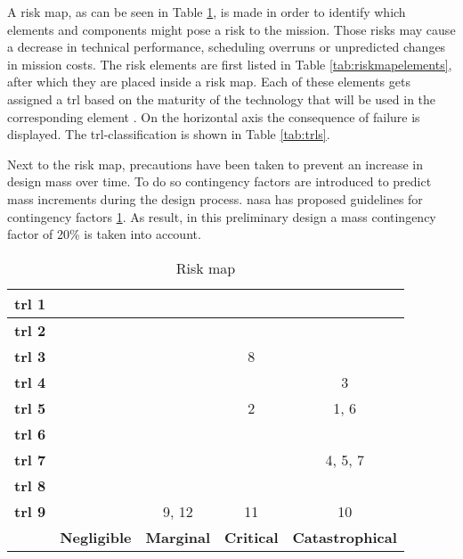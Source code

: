 A risk map, as can be seen in Table \ref{tab:riskmap}, is made in order to identify which elements and components might pose a risk to the mission. Those risks may cause a decrease in technical performance, scheduling overruns or unpredicted changes in mission costs. The risk elements are first listed in Table \ref{tab:riskmapelements}, after which they are placed inside a risk map. Each of these elements gets assigned a \gls{trl} based on the maturity of the technology that will be used in the corresponding element \cite{NASA2007}. On the horizontal axis the consequence of failure is displayed. The \gls{trl}-classification is shown in Table \ref{tab:trls}.

Next to the risk map, precautions have been taken to prevent an increase in design mass over time. To do so contingency factors are introduced to predict mass increments during the design process. \gls{nasa} has proposed guidelines for contingency factors \ref{tab:riskmap}. As result, in this preliminary design a mass contingency factor of 20\% is taken into account.

\begin{table}[h]
	\centering
	\caption{Risk map}
	\label{tab:riskmap}
	\begin{tabular}{|c|c|c|c|c|} %
		\hline
		\textbf{\gls{trl} 1} & \cellcolor{green!70} & \cellcolor{yellow!75}  & \cellcolor{red!60} & \cellcolor{red!60}  \\ \hline
		\textbf{\gls{trl} 2} & \cellcolor{green!70} & \cellcolor{yellow!75}  & \cellcolor{red!60} & \cellcolor{red!60} \\ \hline
		\textbf{\gls{trl} 3} & \cellcolor{green!70} & \cellcolor{yellow!75} & \cellcolor{yellow!75} 8 & \cellcolor{red!60}  \\ \hline
		\textbf{\gls{trl} 4} & \cellcolor{green!70} & \cellcolor{yellow!75} & \cellcolor{yellow!75} & \cellcolor{yellow!75} 3 \\ \hline
		\textbf{\gls{trl} 5} & \cellcolor{green!70} & \cellcolor{green!70} & \cellcolor{yellow!75} 2 & \cellcolor{yellow!75} 1, 6 \\ \hline
		\textbf{\gls{trl} 6} & \cellcolor{green!70} & \cellcolor{green!70} & \cellcolor{green!70} & \cellcolor{green!70}\\ \hline
		\textbf{\gls{trl} 7} & \cellcolor{green!70} & \cellcolor{green!70} & \cellcolor{green!70} & \cellcolor{green!70} 4, 5, 7 \\ \hline
		\textbf{\gls{trl} 8} & \cellcolor{green!70} & \cellcolor{green!70} & \cellcolor{green!70} & \cellcolor{green!70} \\ \hline
		\textbf{\gls{trl} 9} & \cellcolor{green!70} & \cellcolor{green!70} 9, 12 & \cellcolor{green!70} 11 & \cellcolor{green!70} 10  \\ \hline
		& \textbf{Negligible} & \textbf{Marginal} & \textbf{Critical} & \textbf{Catastrophical} \\ \hline
	\end{tabular}
\end{table}


